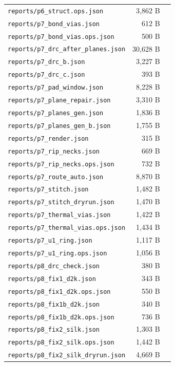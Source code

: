 \documentclass[11pt,a4paper]{article}
\begin{document}
{\begin{longtable}{p{9cm}rp{4cm}}
\texttt{reports/p6\_struct.ops.json} & 3,862 B &  \\
\texttt{reports/p7\_bond\_vias.json} & 612 B &  \\
\texttt{reports/p7\_bond\_vias.ops.json} & 500 B &  \\
\texttt{reports/p7\_drc\_after\_planes.json} & 30,628 B &  \\
\texttt{reports/p7\_drc\_b.json} & 3,227 B &  \\
\texttt{reports/p7\_drc\_c.json} & 393 B &  \\
\texttt{reports/p7\_pad\_window.json} & 8,228 B &  \\
\texttt{reports/p7\_plane\_repair.json} & 3,310 B &  \\
\texttt{reports/p7\_planes\_gen.json} & 1,836 B &  \\
\texttt{reports/p7\_planes\_gen\_b.json} & 1,755 B &  \\
\texttt{reports/p7\_render.json} & 315 B &  \\
\texttt{reports/p7\_rip\_necks.json} & 669 B &  \\
\texttt{reports/p7\_rip\_necks.ops.json} & 732 B &  \\
\texttt{reports/p7\_route\_auto.json} & 8,870 B &  \\
\texttt{reports/p7\_stitch.json} & 1,482 B &  \\
\texttt{reports/p7\_stitch\_dryrun.json} & 1,470 B &  \\
\texttt{reports/p7\_thermal\_vias.json} & 1,422 B &  \\
\texttt{reports/p7\_thermal\_vias.ops.json} & 1,434 B &  \\
\texttt{reports/p7\_u1\_ring.json} & 1,117 B &  \\
\texttt{reports/p7\_u1\_ring.ops.json} & 1,056 B &  \\
\texttt{reports/p8\_drc\_check.json} & 380 B &  \\
\texttt{reports/p8\_fix1\_d2k.json} & 343 B &  \\
\texttt{reports/p8\_fix1\_d2k.ops.json} & 550 B &  \\
\texttt{reports/p8\_fix1b\_d2k.json} & 340 B &  \\
\texttt{reports/p8\_fix1b\_d2k.ops.json} & 736 B &  \\
\texttt{reports/p8\_fix2\_silk.json} & 1,303 B &  \\
\texttt{reports/p8\_fix2\_silk.ops.json} & 1,442 B &  \\
\texttt{reports/p8\_fix2\_silk\_dryrun.json} & 4,669 B &  \\

\end{longtable}}
\end{document}
